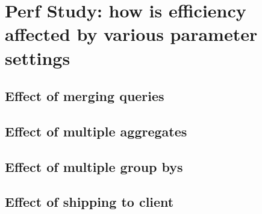 \section{Perf Study: how is efficiency affected by various parameter settings}
\subsection{Effect of merging queries}
\subsection{Effect of multiple aggregates}
\subsection{Effect of multiple group bys}
\subsection{Effect of shipping to client}